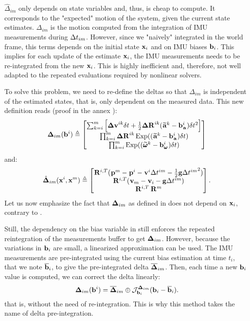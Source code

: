 $\hat\Delta_{im}$ only depends on state variables and, thus, is cheap to compute. It corresponds to the "expected" motion of the system, given the current state estimates. 
$\Delta_{im}$ is the motion computed from the integration of IMU measurements during $\Delta t_{im}$. However, since we "naively" integrated
in the world frame, this terms depends on the initial state ${\bf x}_i$ and on IMU biases ${\bf b}_i$. This implies for each update of the estimate ${\bf x}_i$, the IMU measurements needs to be re-integrated from the new ${\bf x}_i$. This is highly inefficient and, therefore, not well adapted to the repeated evaluations required by nonlinear solvers.

To solve this problem, we need to re-define the deltas so that $\Delta_{im}$ is independent of the estimated states, that is, only dependent on the measured data. This new definition reads \cite{lupton-09, forster2015imu} (proof in the annex ):
%
\begin{align}
    {\bm \Delta}_{im}({\bf b}^i) \triangleq 
    \begin{bmatrix}
    \sum_{k=i}^{m} \Big[{\bm \Delta {\bf v}}^{ik}\delta t +  \frac{1}{2} {\bm \Delta {\bf R}}^{ik} (\prescript{}{}{\widetilde{{\bf a}}}_{}^k - {\bf b}_{\prescript{}{}{{\bf a}}_{}}^i)\delta t^2 \Big] \\
    \prod_{k=i}^{m} {\bm \Delta {\bf R}}^{ik} \operatorname*{Exp}((\prescript{}{}{\widetilde{{\bf a}}}_{}^k - {\bf b}_{\prescript{}{}{{\bf a}}_{}}^i)\delta t)  \\
    \prod_{k=i}^{m} \operatorname*{Exp}((\prescript{}{}{\widetilde{\pmb{\omega}}}_{}^k - {\bf b}_{\prescript{}{}{\pmb{\omega}}_{}}^i)\delta t)  
    \end{bmatrix}
    \label{eq:imu_delta}
\end{align}
%
and:
%
\begin{align}
    \hat{{\bm \Delta}}_{im}({\bf x}^i, {\bf x}^m) \triangleq 
    \begin{bmatrix}
    \prescript{}{}{{\bf R}}_{}^{i,T}(\prescript{}{}{{\bf p}}_{}^m - \prescript{}{}{{\bf p}}_{}^i - \prescript{}{}{{\bf v}}_{}^i \Delta t^{im} - \frac{1}{2} {\bf g} {\Delta t^{im}}^2) \\
    \prescript{}{}{{\bf R}}_{}^{i,T} (\prescript{}{}{{\bf v}}_{m} - \prescript{}{}{{\bf v}}_{i} - {\bf g} \Delta t^{im})  \\
    \prescript{}{}{{\bf R}}_{}^{i,T} \prescript{}{}{{\bf R}}_{}^{m}  
    \end{bmatrix}.
\end{align}
%
Let us now emphasize the fact that ${\bm \Delta}_{im}$ as defined in  does not depend on ${\bf x}_i$, contrary to . 

Still, the dependency on the bias variable in  still enforces the repeated reintegration of the measurements buffer to get ${\bm \Delta}_{im}$. 
However, because the variations in ${\bf b}_i$ are small, a linearized approximation can be used. The IMU measurements are pre-integrated using the current bias estimation at time $t_i$, that we note $\overline{{\bf b}}_i$, to give the pre-integrated delta $\overline{{\bm \Delta}}_{im}$.
Then, each time a new ${\bf b}_i$ value is computed, we can correct the delta linearly:
%
\begin{align}
    {\bm \Delta}_{im}({\bf b}^i) = \overline{{\bm \Delta}}_{im} \oplus {\mathcal{J}^{{\bm \Delta}_{im}}_{{\bf b}_i}}({\bf b}_i-\overline{{\bf b}}_i).
\end{align}
%
that is, without the need of re-integration. This is why this method takes the name of delta pre-integration.

